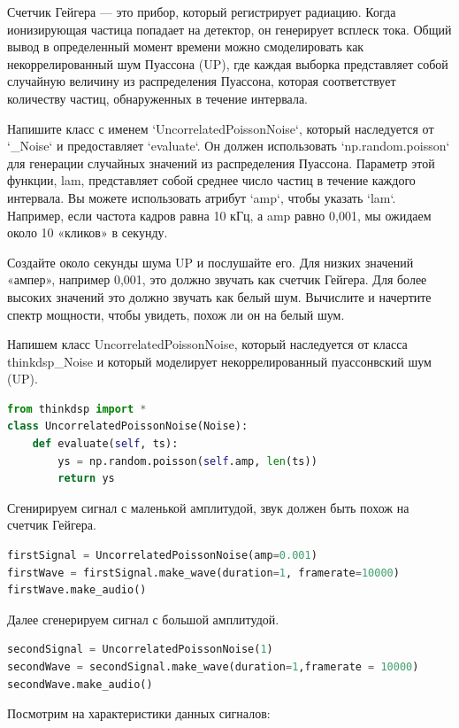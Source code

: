 Счетчик Гейгера — это прибор, который регистрирует радиацию. Когда ионизирующая частица попадает на детектор, он генерирует всплеск тока. Общий вывод в определенный момент времени можно смоделировать как некоррелированный шум Пуассона (UP), где каждая выборка представляет собой случайную величину из распределения Пуассона, которая соответствует количеству частиц, обнаруженных в течение интервала.

Напишите класс с именем `UncorrelatedPoissonNoise`, который наследуется от `\_Noise` и предоставляет `evaluate`. Он должен использовать `np.random.poisson` для генерации случайных значений из распределения Пуассона. Параметр этой функции, lam, представляет собой среднее число частиц в течение каждого интервала. Вы можете использовать атрибут `amp`, чтобы указать `lam`. Например, если частота кадров равна 10 кГц, а amp равно 0,001, мы ожидаем около 10 «кликов» в секунду.

Создайте около секунды шума UP и послушайте его. Для низких значений «ампер», например 0,001, это должно звучать как счетчик Гейгера. Для более высоких значений это должно звучать как белый шум. Вычислите и начертите спектр мощности, чтобы увидеть, похож ли он на белый шум.

Напишем класс UncorrelatedPoissonNoise, который наследуется от класса thinkdsp\_Noise и который моделирует некоррелированный пуассонвский шум (UP).

\begin{lstlisting}[language=Python]
from thinkdsp import *
class UncorrelatedPoissonNoise(Noise):
    def evaluate(self, ts):
        ys = np.random.poisson(self.amp, len(ts))
        return ys
\end{lstlisting}
Сгенирируем сигнал с маленькой амплитудой, звук должен быть похож на счетчик Гейгера.
\begin{lstlisting}[language=Python]
firstSignal = UncorrelatedPoissonNoise(amp=0.001)
firstWave = firstSignal.make_wave(duration=1, framerate=10000)
firstWave.make_audio()
\end{lstlisting}

Далее сгенерируем сигнал с большой амплитудой.

\begin{lstlisting}[language=Python]
secondSignal = UncorrelatedPoissonNoise(1)
secondWave = secondSignal.make_wave(duration=1,framerate = 10000)
secondWave.make_audio()
\end{lstlisting}

Посмотрим на характеристики данных сигналов:

